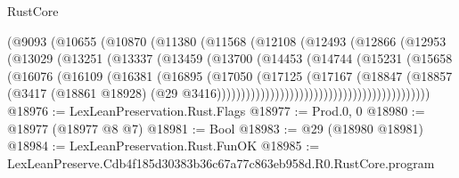 \begin{lexlean}{RustCore}
\begin{coremodule}
                                  (@9093
                                    (@10655
                                      (@10870
                                        (@11380
                                          (@11568
                                            (@12108
                                              (@12493
                                                (@12866
                                                  (@12953
                                                    (@13029
                                                      (@13251
                                                        (@13337
                                                          (@13459
                                                            (@13700
                                                              (@14453
                                                                (@14744
                                                                  (@15231
                                                                    (@15658
                                                                      (@16076
                                                                        (@16109
                                                                          (@16381
                                                                            (@16895
                                                                              (@17050
                                                                                (@17125
                                                                                  (@17167
                                                                                    (@18847
                                                                                      (@18857
                                                                                        (@3417
                                                                                          (@18861
                                                                                            @18928)
                                                                                          (@29
                                                                                            @3416))))))))))))))))))))))))))))))))))))))))))))
@18976 := LexLeanPreservation.Rust.Flags
@18977 := Prod.{0, 0}
@18980 := @18977 (@18977 @8 @7)
@18981 := Bool
@18983 := @29 (@18980 @18981)
@18984 := LexLeanPreservation.Rust.FunOK
@18985 := LexLeanPreserve.Cdb4f185d30383b36c67a77c863eb958d.R0.RustCore.program

\end{coremodule}
\end{lexlean}
